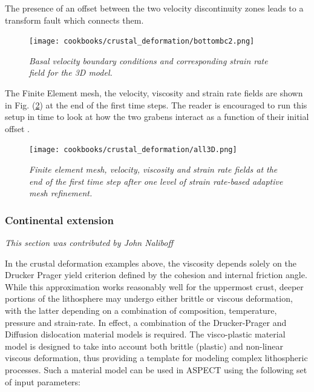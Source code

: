 \documentclass{article}
\newcommand{\aspect}{\textsc{ASPECT}}
\begin{document}


The presence of 
an offset between the two velocity discontinuity zones leads to a transform 
fault which connects them. 

\begin{figure}
  \centering
  \texttt{[image: cookbooks/crustal\_deformation/bottombc2.png]}
  \caption{\it Basal velocity boundary conditions and corresponding 
  strain rate field for the 3D model.} 
  \label{fig:bottombc}
\end{figure}

The Finite Element mesh, the velocity, viscosity and strain rate fields are shown 
in Fig. (\ref{fig:ext3D}) at the end of the first time steps. The reader is encouraged
to run this setup in time to look at how the two grabens interact as a function 
of their initial offset \cite{alht11,alht12,alhf13}.

\begin{figure}
\centering
\texttt{[image: cookbooks/crustal\_deformation/all3D.png]}
\caption{\it Finite element mesh, velocity, viscosity and strain rate fields at
the end of the first time step after one level of strain rate-based adaptive mesh refinement.} 
\label{fig:ext3D}
\end{figure}

\subsubsection{Continental extension}
\label{sec:cookbooks-continental-extension}
\textit{This section was contributed by John Naliboff}

In the crustal deformation examples above, the viscosity depends solely on the Drucker Prager yield criterion defined by the cohesion and internal friction angle. While this approximation works reasonably well for the uppermost crust, deeper portions of the lithosphere may undergo either brittle or viscous deformation, with the latter depending on a combination of composition, temperature, pressure and strain-rate. In effect, a combination of the Drucker-Prager and Diffusion dislocation material models is required. The visco-plastic material model is designed to take into account both brittle (plastic) and non-linear viscous deformation, thus providing a template for modeling complex lithospheric processes. Such a material model can be used in \aspect{} using the following set of input parameters: 
\end{document}
